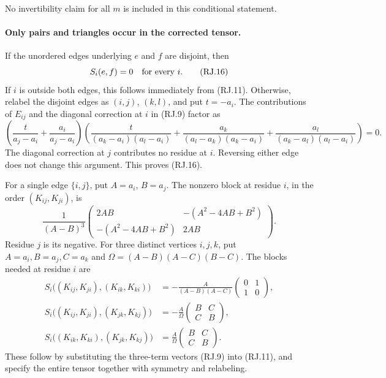 No invertibility claim for all \(m\) is included in this
conditional statement.

\paragraph{Only pairs and triangles occur in the corrected tensor.}
If the unordered edges underlying \(e\) and \(f\) are
disjoint, then
\[
                              S_i(e,f)=0
                              \quad\hbox{for every }i.
                                                               \tag{RJ.16}
\]
If \(i\) is outside both edges, this follows immediately
from (RJ.11). Otherwise, relabel the disjoint edges as
\((i,j)\), \((k,l)\), and put \(t=-a_i\).
The contributions of \(E_{ij}\) and the diagonal
correction at \(i\) in (RJ.9) factor as
\[
 \left(\frac{t}{a_j-a_i}
                   +\frac{a_i}{a_j-a_i}\right)
 \left(
   \frac{t}{(a_k-a_i)(a_l-a_i)}
       +\frac{a_k}{(a_l-a_k)(a_k-a_i)}
       +\frac{a_l}{(a_k-a_l)(a_l-a_i)}
 \right)=0.
 \]
The diagonal correction at \(j\) contributes no residue
at \(i\). Reversing either edge does not change this
argument. This proves (RJ.16).

For a single edge \(\{i,j\}\), put \(A=a_i\), \(B=a_j\).
The nonzero block at residue \(i\), in the order
\((K_{ij},K_{ji})\), is
\[
 \frac1{(A-B)^3}
 \begin{pmatrix}
  2AB&-(A^2-4AB+B^2)\\
  -(A^2-4AB+B^2)&2AB
 \end{pmatrix}.
                                                               \tag{RJ.17}
\]
Residue \(j\) is its negative.
For three distinct vertices \(i,j,k\), put
\(A=a_i,B=a_j,C=a_k\) and
\(\Omega=(A-B)(A-C)(B-C)\).
The blocks needed at residue \(i\) are
\[
 \begin{split}
 S_i\bigl((K_{ij},K_{ji}),(K_{ik},K_{ki})\bigr)
       &=-\frac{A}{(A-B)(A-C)}
                        \begin{pmatrix}0&1\\1&0\end{pmatrix},\\
 S_i\bigl((K_{ij},K_{ji}),(K_{jk},K_{kj})\bigr)
       &=-\frac{A}{\Omega}
                        \begin{pmatrix}B&C\\C&B\end{pmatrix},\\
 S_i\bigl((K_{ik},K_{ki}),(K_{jk},K_{kj})\bigr)
       &=\frac{A}{\Omega}
                        \begin{pmatrix}B&C\\C&B\end{pmatrix}.
 \end{split}                                                   \tag{RJ.18}
\]
These follow by substituting the three-term vectors
(RJ.9) into (RJ.11), and specify the entire tensor
together with symmetry and relabeling.

